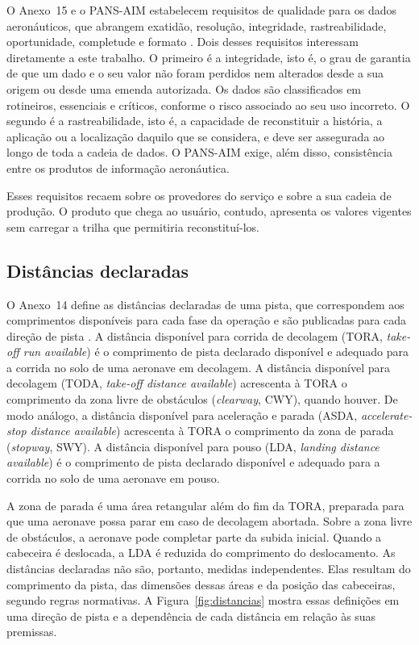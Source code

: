 O Anexo~15 e o PANS-AIM estabelecem requisitos de qualidade para os dados aeronáuticos, que abrangem exatidão, resolução, integridade, rastreabilidade, oportunidade, completude e formato \cite{icao2018anexo15,icao2018pansaim}. Dois desses requisitos interessam diretamente a este trabalho. O primeiro é a integridade, isto é, o grau de garantia de que um dado e o seu valor não foram perdidos nem alterados desde a sua origem ou desde uma emenda autorizada. Os dados são classificados em rotineiros, essenciais e críticos, conforme o risco associado ao seu uso incorreto. O segundo é a rastreabilidade, isto é, a capacidade de reconstituir a história, a aplicação ou a localização daquilo que se considera, e deve ser assegurada ao longo de toda a cadeia de dados. O PANS-AIM exige, além disso, consistência entre os produtos de informação aeronáutica.

Esses requisitos recaem sobre os provedores do serviço e sobre a sua cadeia de produção. O produto que chega ao usuário, contudo, apresenta os valores vigentes sem carregar a trilha que permitiria reconstituí-los.

\subsection{Distâncias declaradas}\label{sec:distancias}

O Anexo~14 define as distâncias declaradas de uma pista, que correspondem aos comprimentos disponíveis para cada fase da operação e são publicadas para cada direção de pista \cite{icao2022anexo14}. A distância disponível para corrida de decolagem (TORA, \textit{take-off run available}) é o comprimento de pista declarado disponível e adequado para a corrida no solo de uma aeronave em decolagem. A distância disponível para decolagem (TODA, \textit{take-off distance available}) acrescenta à TORA o comprimento da zona livre de obstáculos (\textit{clearway}, CWY), quando houver. De modo análogo, a distância disponível para aceleração e parada (ASDA, \textit{accelerate-stop distance available}) acrescenta à TORA o comprimento da zona de parada (\textit{stopway}, SWY). A distância disponível para pouso (LDA, \textit{landing distance available}) é o comprimento de pista declarado disponível e adequado para a corrida no solo de uma aeronave em pouso.

A zona de parada é uma área retangular além do fim da TORA, preparada para que uma aeronave possa parar em caso de decolagem abortada. Sobre a zona livre de obstáculos, a aeronave pode completar parte da subida inicial. Quando a cabeceira é deslocada, a LDA é reduzida do comprimento do deslocamento. As distâncias declaradas não são, portanto, medidas independentes. Elas resultam do comprimento da pista, das dimensões dessas áreas e da posição das cabeceiras, segundo regras normativas. A Figura~\ref{fig:distancias} mostra essas definições em uma direção de pista e a dependência de cada distância em relação às suas premissas.

